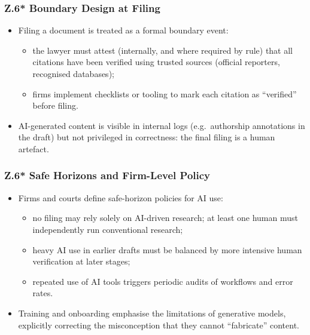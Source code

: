 \subsubsection*{Z.6* Boundary Design at Filing}

\begin{itemize}
  \item Filing a document is treated as a formal boundary event:
        \begin{itemize}
          \item the lawyer must attest (internally, and where required by
                rule) that all citations have been verified using trusted
                sources (official reporters, recognised databases);
          \item firms implement checklists or tooling to mark each citation
                as ``verified'' before filing.
        \end{itemize}
  \item AI-generated content is visible in internal logs (e.g.\ authorship
        annotations in the draft) but not privileged in correctness:
        the final filing is a human artefact.
\end{itemize}

\subsubsection*{Z.6* Safe Horizons and Firm-Level Policy}

\begin{itemize}
  \item Firms and courts define safe-horizon policies for AI use:
        \begin{itemize}
          \item no filing may rely solely on AI-driven research; at least one
                human must independently run conventional research;
          \item heavy AI use in earlier drafts must be balanced by more
                intensive human verification at later stages;
          \item repeated use of AI tools triggers periodic audits of workflows
                and error rates.
        \end{itemize}
  \item Training and onboarding emphasise the limitations of generative
        models, explicitly correcting the misconception that they cannot
        ``fabricate'' content.
\end{itemize}

